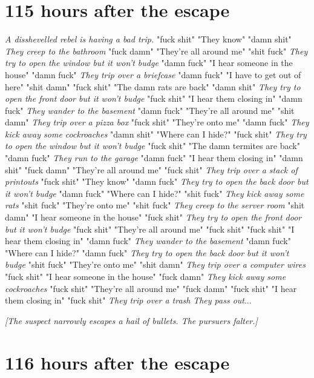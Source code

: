 \documentclass{report}
\begin{document}
\section*{115 \small{hours after the escape}}

\textit{A disshevelled rebel is having a bad trip.} "fuck shit" "They know" "damn shit" \textit{They creep to the bathroom} "fuck damn" "They're all around me" "shit fuck" \textit{They try to open the window but it won't budge} "damn fuck" "I hear someone in the house" "damn fuck" \textit{They trip over a briefcase} "damn fuck" "I have to get out of here" "shit damn" \textit{} "fuck shit" "The damn rats are back" "damn shit" \textit{They try to open the front door but it won't budge} "fuck shit" "I hear them closing in" "damn fuck" \textit{They wander to the basement} "damn fuck" "They're all around me" "shit damn" \textit{They trip over a pizza box} "fuck shit" "They're onto me" "damn fuck" \textit{They kick away some cockroaches} "damn shit" "Where can I hide?" "fuck shit" \textit{They try to open the window but it won't budge} "fuck shit" "The damn termites are back" "damn fuck" \textit{They run to the garage} "damn fuck" "I hear them closing in" "damn shit" \textit{} "fuck damn" "They're all around me" "fuck shit" \textit{They trip over a stack of printouts} "fuck shit" "They know" "damn fuck" \textit{They try to open the back door but it won't budge} "damn fuck" "Where can I hide?" "shit fuck" \textit{They kick away some rats} "shit fuck" "They're onto me" "shit fuck" \textit{They creep to the server room} "shit damn" "I hear someone in the house" "fuck shit" \textit{They try to open the front door but it won't budge} "fuck shit" "They're all around me" "fuck shit" \textit{} "fuck shit" "I hear them closing in" "damn fuck" \textit{They wander to the basement} "damn fuck" "Where can I hide?" "damn fuck" \textit{They try to open the back door but it won't budge} "shit fuck" "They're onto me" "shit damn" \textit{They trip over a computer wires} "fuck shit" "I hear someone in the house" "fuck damn" \textit{They kick away some cockroaches} "fuck shit" "They're all around me" "fuck damn" \textit{} "fuck shit" "I hear them closing in" "fuck shit" \textit{They trip over a trash} \textit{They pass out}...

\textit{[The suspect narrowly escapes a hail of bullets. The pursuers falter.]}


\section*{116 \small{hours after the escape}}
\end{document}

